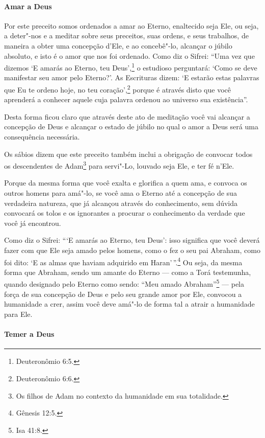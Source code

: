 \begin{multicols}{2}
\paragraph{Amar a Deus}

Por este preceito somos ordenados a amar ao Eterno, enaltecido seja
Ele, ou seja, a deter"-nos e a meditar sobre seus preceitos, suas ordens,
e seus trabalhos, de maneira a obter uma concepção d'Ele, e ao
concebê"-lo, alcançar o júbilo absoluto, e isto é o amor que nos foi
ordenado. Como diz o Sifrei\starr: ``Uma vez que dizemos `E amarás ao Eterno,
teu Deus',\footnote{Deuteronômio 6:5.} o estudioso perguntará: `Como se deve
manifestar seu amor pelo Eterno?'. As Escrituras dizem: `E estarão
estas palavras que Eu te ordeno hoje, no teu coração',\footnote{Deuteronômio
6:6.} porque é através disto que você aprenderá a conhecer aquele cuja
palavra ordenou ao universo sua existência''.

Desta forma ficou claro que através deste ato de meditação você vai
alcançar a concepção de Deus e alcançar o estado de júbilo no qual o
amor a Deus será uma consequência necessária.

Os sábios dizem que este preceito também inclui a obrigação de convocar todos os descendentes de Adam\footnote{Os filhos de Adam no contexto da humanidade em sua totalidade.} para servi"-Lo, louvado seja Ele, e ter fé n'Ele. 

Porque da mesma forma que você exalta e glorifica a
quem ama, e convoca os outros homens para amá"-lo, se você ama o Eterno
até a concepção de sua verdadeira natureza, que já alcançou através do
conhecimento, sem dúvida convocará os tolos e os ignorantes a procurar
o conhecimento da verdade que você já encontrou.

Como diz o Sifrei\starr: ```E amarás ao Eterno, teu Deus': isso significa que
você deverá fazer com que Ele seja amado pelos homens, como o fez o seu
pai Abraham, como foi dito: `E as almas que haviam adquirido em Haran\starr'\,''.\footnote{Gênesis 12:5.} Ou seja, da mesma forma que Abraham, sendo um amante do Eterno --- como a Torá\starr{} testemunha, quando designado pelo Eterno como
sendo: ``Meu amado Abraham''\footnote{Isa 41:8.} --- pela força de sua
concepção de Deus e pelo seu grande amor por Ele, convocou a humanidade a crer, assim você deve amá"-lo de forma tal a atrair a humanidade para Ele.

\paragraph{Temer a Deus}


\end{multicols}
